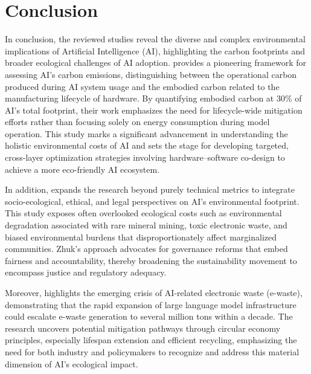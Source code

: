 \documentclass[a4paper, 12pt]{article}
\begin{document}
\section{Conclusion}
In conclusion, the reviewed studies reveal the diverse and complex environmental implications of Artificial Intelligence (AI), highlighting the carbon footprints and broader ecological challenges of AI adoption. \citet{Wu2022} provides a pioneering framework for assessing AI’s carbon emissions, distinguishing between the operational carbon produced during AI system usage and the embodied carbon related to the manufacturing lifecycle of hardware. By quantifying embodied carbon at 30\% of AI’s total footprint, their work emphasizes the need for lifecycle-wide mitigation efforts rather than focusing solely on energy consumption during model operation. This study marks a significant advancement in understanding the holistic environmental costs of AI and sets the stage for developing targeted, cross-layer optimization strategies involving hardware–software co-design to achieve a more eco-friendly AI ecosystem.  \hfill \break

\par In addition, \citet{Zhuk2023} expands the research beyond purely technical metrics to integrate socio-ecological, ethical, and legal perspectives on AI’s environmental footprint. This study exposes often overlooked ecological costs such as environmental degradation associated with rare mineral mining, toxic electronic waste, and biased environmental burdens that disproportionately affect marginalized communities. Zhuk’s approach advocates for governance reforms that embed fairness and accountability, thereby broadening the sustainability movement to encompass justice and regulatory adequacy.  \hfill \break

\par Moreover, \citet{wang_2024_ewaste} highlights the emerging crisis of AI-related electronic waste (e-waste), demonstrating that the rapid expansion of large language model infrastructure could escalate e-waste generation to several million tons within a decade. The research uncovers potential mitigation pathways through circular economy principles, especially lifespan extension and efficient recycling, emphasizing the need for both industry and policymakers to recognize and address this material dimension of AI’s ecological impact.  \hfill \break
\end{document}
